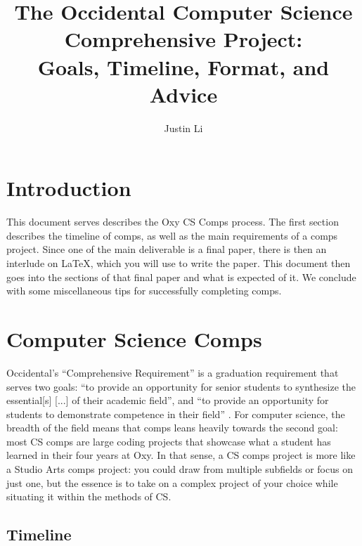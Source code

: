 \documentclass[10pt,twocolumn]{article}
\title{The Occidental Computer Science Comprehensive Project: \\ Goals, Timeline, Format, and Advice}
\author{Justin Li}
\affiliation{Occidental College}
\begin{document}
\maketitle

\section{Introduction}

This document serves describes the Oxy CS Comps process.
The first section describes the timeline of comps, as well as the main requirements of a comps project.
Since one of the main deliverable is a final paper, there is then an interlude on {\LaTeX}, which you will use to write the paper.
This document then goes into the sections of that final paper and what is expected of it.
We conclude with some miscellaneous tips for successfully completing comps.

\section{Computer Science Comps}

Occidental's ``Comprehensive Requirement'' is a graduation requirement that serves two goals: ``to provide an opportunity for senior students to synthesize the essential[s] [...] of their academic field'', and ``to provide an opportunity for students to demonstrate competence in their field'' \cite{OccidentalComps}.
For computer science, the breadth of the field means that comps leans heavily towards the second goal: most CS comps are large coding projects that showcase what a student has learned in their four years at Oxy.
In that sense, a CS comps project is more like a Studio Arts comps project: you could draw from multiple subfields or focus on just one, but the essence is to take on a complex project of your choice while situating it within the methods of CS.

\subsection{Timeline}
\end{document}
